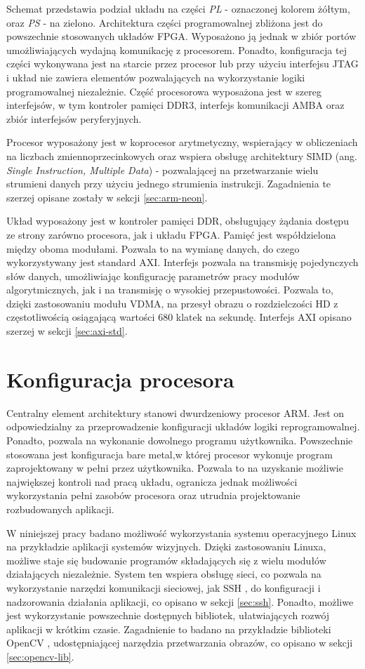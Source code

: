 Schemat przedstawia podział układu na części \emph{PL} - oznaczonej kolorem żółtym, oraz \emph{PS} - na zielono.
Architektura części programowalnej zbliżona jest do powszechnie stosowanych układów FPGA. Wyposażono ją jednak w zbiór portów umożliwiających wydajną komunikację z procesorem. Ponadto, konfiguracja tej części wykonywana jest na starcie przez procesor lub przy użyciu interfejsu JTAG i układ nie zawiera elementów pozwalających na wykorzystanie logiki programowalnej niezależnie.
Część procesorowa wyposażona jest w szereg interfejsów, w tym kontroler pamięci DDR3, interfejs komunikacji AMBA oraz zbiór interfejsów peryferyjnych.

Procesor wyposażony jest w koprocesor arytmetyczny, wspierający w obliczeniach na liczbach zmiennoprzecinkowych oraz wspiera obsługę architektury SIMD (ang. \emph{Single Instruction, Multiple Data}) - pozwalającej na przetwarzanie wielu strumieni danych przy użyciu jednego strumienia instrukcji. Zagadnienia te szerzej opisane zostały w sekcji \ref{sec:arm-neon}.

Układ wyposażony jest w kontroler pamięci DDR, obsługujący żądania dostępu ze strony zarówno procesora, jak i układu FPGA. Pamięć jest współdzielona między oboma modułami. Pozwala to na wymianę danych, do czego wykorzystywany jest standard AXI. Interfejs pozwala na transmisję pojedynczych słów danych, umożliwiając konfigurację parametrów pracy modułów algorytmicznych, jak i na transmisję o wysokiej przepustowości. Pozwala to, dzięki zastosowaniu modułu VDMA, na przesył obrazu o rozdzielczości HD z częstotliwością osiągającą wartości 680 klatek na sekundę. \cite{axi-vdma-guide} Interfejs AXI opisano szerzej w sekcji \ref{sec:axi-std}.

\section{Konfiguracja procesora}
\label{sec:arm-programming}
Centralny element architektury stanowi dwurdzeniowy procesor ARM. Jest on odpowiedzialny za przeprowadzenie konfiguracji układów logiki reprogramowalnej. Ponadto, pozwala na wykonanie dowolnego programu użytkownika. Powszechnie stosowana jest konfiguracja bare metal,w której procesor wykonuje program zaprojektowany w pełni przez użytkownika. Pozwala to na uzyskanie możliwie największej kontroli nad pracą układu, ogranicza jednak możliwości wykorzystania pełni zasobów procesora oraz utrudnia projektowanie rozbudowanych aplikacji.

W niniejszej pracy badano możliwość wykorzystania systemu operacyjnego Linux na przykładzie aplikacji systemów wizyjnych. Dzięki zastosowaniu Linuxa, możliwe staje się budowanie programów składających się z wielu modułów działających niezależnie. System ten wspiera obsługę sieci, co pozwala na wykorzystanie narzędzi komunikacji sieciowej, jak SSH \cite{ssh-protocol}, do konfiguracji i nadzorowania działania aplikacji, co opisano w sekcji \ref{sec:ssh}. Ponadto, możliwe jest wykorzystanie powszechnie dostępnych bibliotek, ułatwiających rozwój aplikacji w krótkim czasie. Zagadnienie to badano na przykładzie biblioteki OpenCV \cite{opencv-library}, udostępniającej narzędzia przetwarzania obrazów, co opisano w sekcji \ref{sec:opencv-lib}.

